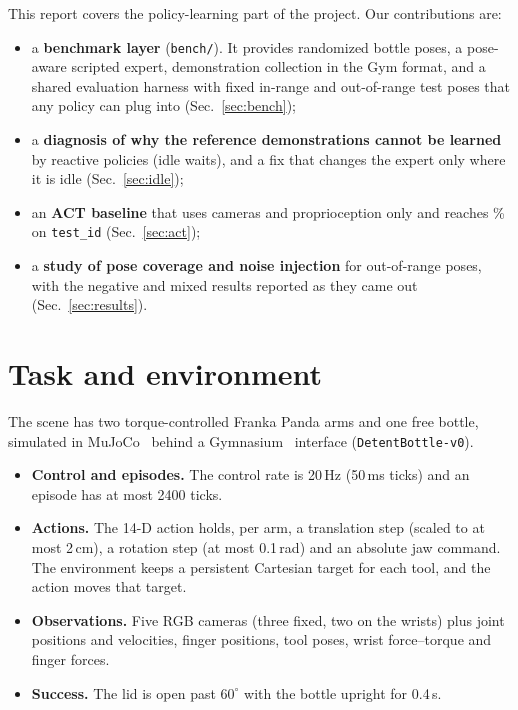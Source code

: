 \documentclass[10pt,twocolumn,letterpaper]{article}
\newcommand{\ttt}[1]{\texttt{\small #1}}
\begin{document}
This report covers the policy-learning part of the project. Our contributions are:
\begin{itemize}\itemsep0pt
  \item a \textbf{benchmark layer} (\ttt{bench/}). It provides randomized bottle poses, a pose-aware scripted
  expert, demonstration collection in the Gym format, and a shared evaluation harness with fixed in-range and
  out-of-range test poses that any policy can plug into (Sec.~\ref{sec:bench});
  \item a \textbf{diagnosis of why the reference demonstrations cannot be learned} by reactive policies (idle
  waits), and a fix that changes the expert only where it is idle (Sec.~\ref{sec:idle});
  \item an \textbf{ACT baseline} that uses cameras and proprioception only and reaches \VtwoId\% on
  \ttt{test\_id} (Sec.~\ref{sec:act});
  \item a \textbf{study of pose coverage and noise injection} for out-of-range poses, with the negative and
  mixed results reported as they came out (Sec.~\ref{sec:results}).
\end{itemize}

\section{Task and environment}\label{sec:env}
The scene has two torque-controlled Franka Panda arms and one free bottle, simulated in MuJoCo~\cite{mujoco}
behind a Gymnasium~\cite{gymnasium} interface (\ttt{DetentBottle-v0}).
\begin{itemize}\itemsep0pt
  \item \textbf{Control and episodes.} The control rate is 20\,Hz (50\,ms ticks) and an episode has at most
  2400 ticks.
  \item \textbf{Actions.} The 14-D action holds, per arm, a translation step (scaled to at most 2\,cm), a
  rotation step (at most 0.1\,rad) and an absolute jaw command. The environment keeps a persistent Cartesian
  target for each tool, and the action moves that target.
  \item \textbf{Observations.} Five RGB cameras (three fixed, two on the wrists) plus joint positions and
  velocities, finger positions, tool poses, wrist force--torque and finger forces.
  \item \textbf{Success.} The lid is open past $60^\circ$ with the bottle upright for 0.4\,s.
\end{itemize}
\end{document}
